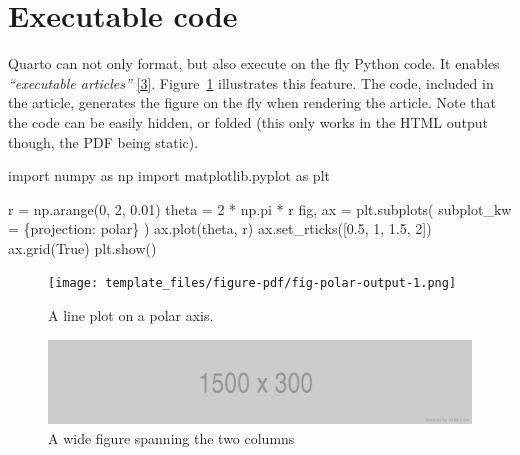\documentclass[letterpaper, 10 pt, journal, twoside]{IEEEtran}
\newenvironment{Shaded}{\begin{snugshade}}{\end{snugshade}}
\newcommand{\DecValTok}[1]{\textcolor[rgb]{0.68,0.00,0.00}{#1}}
\newcommand{\FloatTok}[1]{\textcolor[rgb]{0.68,0.00,0.00}{#1}}
\newcommand{\ImportTok}[1]{\textcolor[rgb]{0.00,0.46,0.62}{#1}}
\newcommand{\NormalTok}[1]{\textcolor[rgb]{0.00,0.23,0.31}{#1}}
\newcommand{\OperatorTok}[1]{\textcolor[rgb]{0.37,0.37,0.37}{#1}}
\newcommand{\StringTok}[1]{\textcolor[rgb]{0.13,0.47,0.30}{#1}}
\newcommand{\VariableTok}[1]{\textcolor[rgb]{0.07,0.07,0.07}{#1}}
\newcommand\muted[1]{%
\bgroup
\hskip0pt\color{black!40!}%
#1%
\egroup
}
\begin{document}
\muted{\lipsum[1-2]}

\hypertarget{executable-code}{%
\section{Executable code}\label{executable-code}}

Quarto can not only format, but also execute on the fly Python code. It
enables \emph{``executable articles''}
\protect\hyperlink{ref-Lasser2020-wo}{{[}3{]}}. Figure~\ref{fig-polar}
illustrates this feature. The code, included in the article, generates
the figure on the fly when rendering the article. Note that the code can
be easily hidden, or folded (this only works in the HTML output though,
the PDF being static).

\begin{Shaded}
\begin{Highlighting}[]
\ImportTok{import}\NormalTok{ numpy }\ImportTok{as}\NormalTok{ np}
\ImportTok{import}\NormalTok{ matplotlib.pyplot }\ImportTok{as}\NormalTok{ plt}

\NormalTok{r }\OperatorTok{=}\NormalTok{ np.arange(}\DecValTok{0}\NormalTok{, }\DecValTok{2}\NormalTok{, }\FloatTok{0.01}\NormalTok{)}
\NormalTok{theta }\OperatorTok{=} \DecValTok{2} \OperatorTok{*}\NormalTok{ np.pi }\OperatorTok{*}\NormalTok{ r}
\NormalTok{fig, ax }\OperatorTok{=}\NormalTok{ plt.subplots(}
\NormalTok{  subplot\_kw }\OperatorTok{=}\NormalTok{ \{}\StringTok{\textquotesingle{}projection\textquotesingle{}}\NormalTok{: }\StringTok{\textquotesingle{}polar\textquotesingle{}}\NormalTok{\} }
\NormalTok{)}
\NormalTok{ax.plot(theta, r)}
\NormalTok{ax.set\_rticks([}\FloatTok{0.5}\NormalTok{, }\DecValTok{1}\NormalTok{, }\FloatTok{1.5}\NormalTok{, }\DecValTok{2}\NormalTok{])}
\NormalTok{ax.grid(}\VariableTok{True}\NormalTok{)}
\NormalTok{plt.show()}
\end{Highlighting}
\end{Shaded}

\begin{figure}[H]

{\centering \texttt{[image: template\_files/figure-pdf/fig-polar-output-1.png]}

}

\caption{\label{fig-polar}A line plot on a polar axis.}

\end{figure}

\begin{figure}

{\centering \includegraphics{fig-wide.png}

}

\caption{\label{fig-wide}A wide figure spanning the two columns}

\end{figure}
\end{document}

